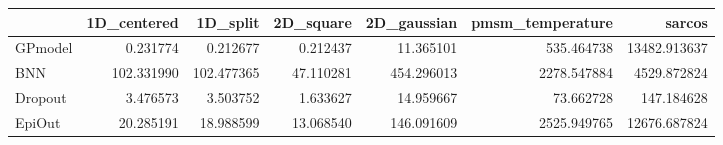 \begin{tabular}{lrrrrrr}
\toprule
{} &  1D\_centered &    1D\_split &  2D\_square &  2D\_gaussian &  pmsm\_temperature &        sarcos \\
\midrule
GPmodel &     0.231774 &    0.212677 &   0.212437 &    11.365101 &        535.464738 &  13482.913637 \\
BNN     &   102.331990 &  102.477365 &  47.110281 &   454.296013 &       2278.547884 &   4529.872824 \\
Dropout &     3.476573 &    3.503752 &   1.633627 &    14.959667 &         73.662728 &    147.184628 \\
EpiOut  &    20.285191 &   18.988599 &  13.068540 &   146.091609 &       2525.949765 &  12676.687824 \\
\bottomrule
\end{tabular}
